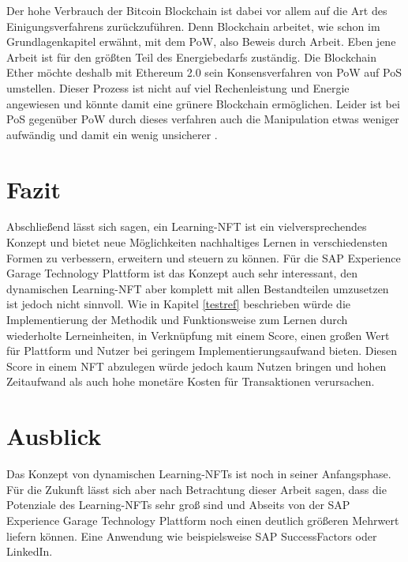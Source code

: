 Der hohe Verbrauch der Bitcoin Blockchain ist dabei vor allem auf die Art des Einigungsverfahrens zurückzuführen.
Denn Blockchain arbeitet, wie schon im Grundlagenkapitel erwähnt, mit dem \acf{PoW}, also \dq Beweis durch Arbeit\dq{}.
Eben jene Arbeit ist für den größten Teil des Energiebedarfs zuständig.
Die Blockchain Ether möchte deshalb mit Ethereum 2.0 sein Konsensverfahren von \ac{PoW} auf \acf{PoS} umstellen.
Dieser Prozess ist nicht auf viel Rechenleistung und Energie angewiesen und könnte damit eine grünere Blockchain ermöglichen.
Leider ist bei \ac{PoS} gegenüber \acf{PoW} durch dieses verfahren auch die Manipulation etwas weniger aufwändig und damit ein wenig unsicherer \parencite[vgl.][]{Ginsburg.10.11.2021}.

\section{Fazit}

Abschließend lässt sich sagen, ein Learning-NFT ist ein vielversprechendes Konzept und bietet neue Möglichkeiten nachhaltiges Lernen in verschiedensten Formen zu verbessern, erweitern und steuern zu können.
Für die SAP Experience Garage Technology Plattform ist das Konzept auch sehr interessant, den dynamischen Learning-NFT aber komplett mit allen Bestandteilen umzusetzen ist jedoch nicht sinnvoll.
Wie in Kapitel \ref{testref} beschrieben würde die Implementierung der Methodik und Funktionsweise zum Lernen durch wiederholte Lerneinheiten, in Verknüpfung mit einem Score,
einen großen Wert für Plattform und Nutzer bei geringem Implementierungsaufwand bieten.
Diesen Score in einem NFT abzulegen würde jedoch kaum Nutzen bringen und hohen Zeitaufwand als auch hohe monetäre Kosten für Transaktionen verursachen. 

\section{Ausblick}

Das Konzept von dynamischen Learning-NFTs ist noch in seiner Anfangsphase.
Für die Zukunft lässt sich aber nach Betrachtung dieser Arbeit sagen, dass die Potenziale des Learning-NFTs sehr groß sind und Abseits von der SAP Experience Garage Technology Plattform noch einen deutlich größeren Mehrwert liefern können.
Eine Anwendung wie beispielsweise SAP SuccessFactors \parencite[]{SAP.28.08.2022} oder LinkedIn.
